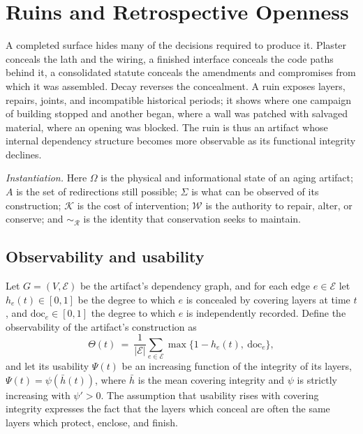 \section{Ruins and Retrospective Openness}\label{sec:ruins}

A completed surface hides many of the decisions required to produce it. Plaster conceals the lath and the wiring, a finished interface conceals the code paths behind it, a consolidated statute conceals the amendments and compromises from which it was assembled. Decay reverses the concealment. A ruin exposes layers, repairs, joints, and incompatible historical periods; it shows where one campaign of building stopped and another began, where a wall was patched with salvaged material, where an opening was blocked. The ruin is thus an artifact whose internal dependency structure becomes more observable as its functional integrity declines.

\emph{Instantiation.} Here $\Omega$ is the physical and informational state of an aging artifact; $A$ is the set of redirections still possible; $\Sigma$ is what can be observed of its construction; $\mathcal{K}$ is the cost of intervention; $\mathcal{W}$ is the authority to repair, alter, or conserve; and $\sim_{\mathcal{R}}$ is the identity that conservation seeks to maintain.

\subsection{Observability and usability}

Let $G=(V,\mathcal{E})$ be the artifact's dependency graph, and for each edge $e\in\mathcal{E}$ let $h_e(t)\in[0,1]$ be the degree to which $e$ is concealed by covering layers at time $t$, and $\mathrm{doc}_e\in[0,1]$ the degree to which $e$ is independently recorded. Define the observability of the artifact's construction as
\begin{equation}
\Theta(t)\ =\ \frac{1}{|\mathcal{E}|}\sum_{e\in\mathcal{E}}\max\big\{1-h_e(t),\ \mathrm{doc}_e\big\},
\end{equation}
and let its usability $\Psi(t)$ be an increasing function of the integrity of its layers, $\Psi(t)=\psi(\bar h(t))$, where $\bar h$ is the mean covering integrity and $\psi$ is strictly increasing with $\psi'>0$. The assumption that usability rises with covering integrity expresses the fact that the layers which conceal are often the same layers which protect, enclose, and finish.

